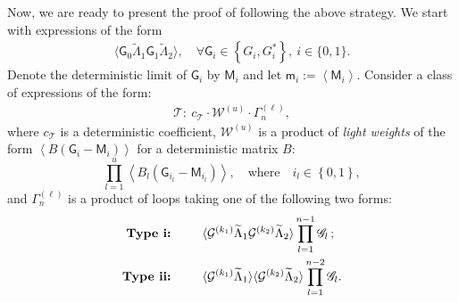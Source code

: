 \documentclass[10pt,reqno]{amsart}
\numberwithin{equation}{section}
\numberwithin{figure}{section}
\newcommand{\rmnum}[1]{\uppercase\expandafter{\romannumeral #1}}
\theoremstyle{plain} %
\theoremstyle{definition} %
\newcommand{\wt}{\widetilde}
\newcommand{\cG}{{\mathcal G}}
\newcommand{\cW}{{\mathcal W}}
\newcommand{\cT}{\mathcal T}
\newcommand{\sG}{\mathsf G}
\newcommand{\sM}{\mathsf M}
\newcommand{\scG}{\mathscr{G}}
\newcommand{\pa}[1]{\left({#1}\right)}
\newcommand{\ha}[1]{\left\{{#1}\right\}}
\newcommand{\avg}[1]{\langle #1 \rangle}
\newcommand{\avga}[1]{\left\langle #1 \right\rangle}
\newcommand{\tLambda}{{\wt{\Lambda}}}
\newcommand{\tl}{\tLambda}
\newcommand{\mm}{\ell}
\numberwithin{equation}{section}
\begin{document}
Now, we are ready to present the proof of  following the above strategy. We start with expressions of the form
    \begin{equation}\label{eq;expT0}
        \begin{aligned}
            \avg{\sG_0\tl_1\sG_1\tl_2},\quad \forall \sG_i\in \ha{G_i,G_i^*},\ i\in \{0,1\}.
        \end{aligned}
    \end{equation}
Denote the deterministic limit of $\sG_i$ by $\sM_i$ and let $\mathsf{m}_i:=\avga{\sM_i}$. Consider a class of expressions of the form:
\begin{equation}\label{definition_class_of_expression_loop}
        \begin{aligned}
            \cT:\ c_{\cT}\cdot\cW^{\pa{u}}\cdot \Gamma_{n}^{\pa{\mm}},
        \end{aligned}
    \end{equation}
    where $c_{\cT}$ is a deterministic coefficient, $\cW^{\pa{u}}$ is a product of \emph{light weights} of the form $\avga{B\pa{\sG_{i}-\sM_{i}}}$ for a deterministic matrix $B$:
    \begin{equation}\nonumber
        \prod_{l=1}^u \avga{B_{l}\pa{\sG_{i_l}-\sM_{i_l}}},\quad \text{where}\quad i_l\in\ha{0,1},  
    \end{equation}
    and $\Gamma_n^{\pa{\mm}}$ is a product of loops taking one of the following two forms:
    \begin{align}\label{Gamma_Type_1}
            \textbf{Type \rmnum{1}: }\qquad &\avg{\cG^{\pa{k_1}}\tl_1\cG^{\pa{k_2}}\tl_2}\prod_{l=1}^{n-1}\scG_l\, ;\\
            \label{Gamma_Type_2}
             \textbf{Type \rmnum{2}: } \qquad    &\avg{\cG^{\pa{k_1}}\tl_1}\avg{\cG^{\pa{k_2}}\tl_2}\prod_{l=1}^{n-2}\scG_l.
    \end{align}     
\end{document}
